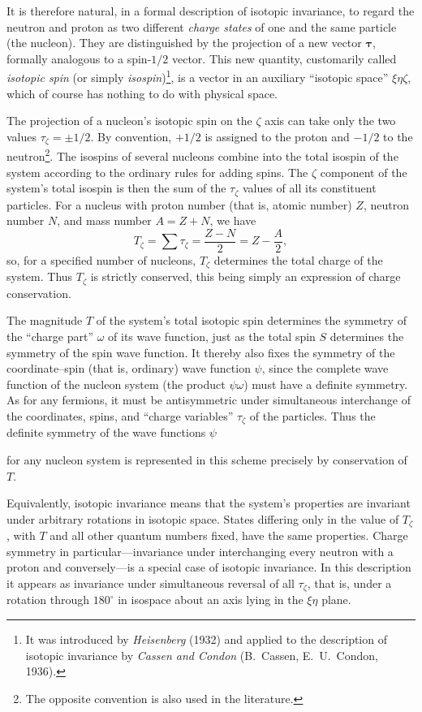 It is therefore natural, in a formal description of isotopic invariance, to
regard the neutron and proton as two different \emph{charge states} of one and
the same particle (the nucleon). They are distinguished by the projection of a
new vector $\boldsymbol\tau$, formally analogous to a spin-$1/2$ vector. This
new quantity, customarily called \emph{isotopic spin} (or simply
\emph{isospin})\footnote{It was introduced by \emph{Heisenberg} (1932) and
applied to the description of isotopic invariance by \emph{Cassen and Condon}
(B.~Cassen, E.~U.~Condon, 1936).}, is a vector in an auxiliary ``isotopic
space'' $\xi\eta\zeta$, which of course has nothing to do with physical space.

The projection of a nucleon's isotopic spin on the $\zeta$ axis can take only
the two values $\tau_\zeta=\pm1/2$. By convention, $+1/2$ is assigned to the
proton and $-1/2$ to the neutron\footnote{The opposite convention is also used
in the literature.}. The isospins of several nucleons combine into the total
isospin of the system according to the ordinary rules for adding spins. The
$\zeta$ component of the system's total isospin is then the sum of the
$\tau_\zeta$ values of all its constituent particles. For a nucleus with
proton number (that is, atomic number) $Z$, neutron number $N$, and mass number
$A=Z+N$, we have
\begin{equation}
 T_\zeta=\sum\tau_\zeta=\frac{Z-N}{2}=Z-\frac A2,
 \tag{116.1}
\end{equation}
so, for a specified number of nucleons, $T_\zeta$ determines the total charge
of the system. Thus $T_\zeta$ is strictly conserved, this being simply an
expression of charge conservation.

The magnitude $T$ of the system's total isotopic spin determines the symmetry
of the ``charge part'' $\omega$ of its wave function, just as the total spin
$S$ determines the symmetry of the spin wave function. It thereby also fixes
the symmetry of the coordinate--spin (that is, ordinary) wave function $\psi$,
since the complete wave function of the nucleon system (the product
$\psi\omega$) must have a definite symmetry. As for any fermions, it must be
antisymmetric under simultaneous interchange of the coordinates, spins, and
``charge variables'' $\tau_\zeta$ of the particles. Thus the definite symmetry
of the wave functions $\psi$

for any nucleon system is represented in this scheme precisely by conservation
of $T$.

Equivalently, isotopic invariance means that the system's properties are
invariant under arbitrary rotations in isotopic space. States differing only
in the value of $T_\zeta$, with $T$ and all other quantum numbers fixed, have
the same properties. Charge symmetry in particular---invariance under
interchanging every neutron with a proton and conversely---is a special case
of isotopic invariance. In this description it appears as invariance under
simultaneous reversal of all $\tau_\zeta$, that is, under a rotation through
$180^\circ$ in isospace about an axis lying in the $\xi\eta$ plane.

